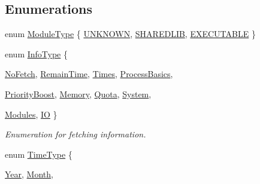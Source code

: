 \subsection*{Enumerations}
\begin{DoxyCompactItemize}
\item 
enum \hyperlink{namespaceSystem_a12d36cf455e22c1e75ef65a2105df4c5}{ModuleType} \{ \hyperlink{namespaceSystem_a12d36cf455e22c1e75ef65a2105df4c5a674d015a465c28de6e2f385f071c25a2}{UNKNOWN}, 
\hyperlink{namespaceSystem_a12d36cf455e22c1e75ef65a2105df4c5a2caa15b2f0df35f7d8b6c3d3f9f52d44}{SHAREDLIB}, 
\hyperlink{namespaceSystem_a12d36cf455e22c1e75ef65a2105df4c5a130859e092dc88d9e2eed92640885830}{EXECUTABLE}
 \}
\item 
enum \hyperlink{namespaceSystem_a71a46d52920ca8e98fc4649949be58a7}{InfoType} \{ \par
\hyperlink{namespaceSystem_a71a46d52920ca8e98fc4649949be58a7a06b65239d2b9cf972786593c95d864a6}{NoFetch}, 
\hyperlink{namespaceSystem_a71a46d52920ca8e98fc4649949be58a7ad2436bf33fca09ddbc196b7145b3cca5}{RemainTime}, 
\hyperlink{namespaceSystem_a71a46d52920ca8e98fc4649949be58a7a3f922834570db4b74edefd683ee0424b}{Times}, 
\hyperlink{namespaceSystem_a71a46d52920ca8e98fc4649949be58a7abf68053aed010d37fad9cb7247259406}{ProcessBasics}, 
\par
\hyperlink{namespaceSystem_a71a46d52920ca8e98fc4649949be58a7a09f7fed636a453ce56c03452d1cc3169}{PriorityBoost}, 
\hyperlink{namespaceSystem_a71a46d52920ca8e98fc4649949be58a7a4aa1e712ac90a1de65e65af2bebd59dc}{Memory}, 
\hyperlink{namespaceSystem_a71a46d52920ca8e98fc4649949be58a7ace0b09a8b0f5c6a1973163673cd11edb}{Quota}, 
\hyperlink{namespaceSystem_a71a46d52920ca8e98fc4649949be58a7a84af275c6c9199216bc0322a1aa67cb1}{System}, 
\par
\hyperlink{namespaceSystem_a71a46d52920ca8e98fc4649949be58a7a20de13f42ce0e8b367828515b481abf1}{Modules}, 
\hyperlink{namespaceSystem_a71a46d52920ca8e98fc4649949be58a7a6bf4eb18563020d8de7717f2e918a34e}{IO}
 \}
\begin{DoxyCompactList}\small\item\em Enumeration for fetching information. \item\end{DoxyCompactList}\item 
enum \hyperlink{namespaceSystem_a15db094516c062b412df2453b4350f1a}{TimeType} \{ \par
\hyperlink{namespaceSystem_a15db094516c062b412df2453b4350f1aa64832eae7c2445025f46f1edffee0dc9}{Year}, 
\hyperlink{namespaceSystem_a15db094516c062b412df2453b4350f1aa9cb8038eade78dc7e9eea70e011bf486}{Month}, 

\end{DoxyCompactItemize}
